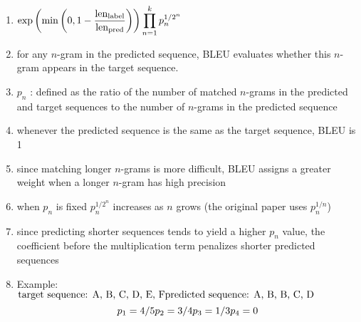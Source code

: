 \begin{enumerate}[itemsep=0.2cm]
    \item[] $
        \hfill
        \exp\left(\min\left(0, 1 - \dfrac{\textrm{len}_{\textrm{label}}}{\textrm{len}_{\textrm{pred}}}\right)\right) \dprod_{n=1}^k p_n^{1/2^n}
        \hfill
    $

    \item for any $n$-gram in the predicted sequence, BLEU evaluates whether this $n$-gram appears in the target sequence.

    \item $p_n$ : defined as the ratio of the number of matched $n$-grams in the predicted and target sequences to the number of $n$-grams in the predicted sequence
    
    \item whenever the predicted sequence is the same as the target sequence, BLEU is 1

    \item since matching longer $n$-grams is more difficult, BLEU assigns a greater weight when a longer $n$-gram has high precision

    \item when $p_n$ is fixed $p_n^{1/2^n}$ increases as $n$ grows (the original paper uses $p_n^{1/n}$)

    \item since predicting shorter sequences tends to yield a higher $p_n$ value, the coefficient before the multiplication term penalizes shorter predicted sequences

    \item Example: 
    $
        \hfill 
        \text{target sequence: A, B, C, D, E, F}  
        \hfill 
        \text{predicted sequence: A, B, B, C, D} 
        \hfill
    $
    \[
        \hfill
        p_1 = 4/5
        \hfill
        p_2 = 3/4
        \hfill
        p_3 = 1/3
        \hfill
        p_4 = 0
        \hfill
    \]

    
\end{enumerate}

